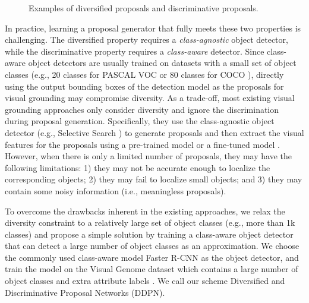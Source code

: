 \documentclass{article}
\begin{document}
\begin{figure}
\begin{center}
\vspace{-10pt}
\caption{Examples of diversified proposals and discriminative proposals.}
\label{fig:ddpg_examples}
\end{center}
\vspace{-20pt}
\end{figure}

In practice, learning a proposal generator that fully meets these two properties is challenging. The diversified property requires a \emph{class-agnostic} object detector, while the discriminative property requires a \emph{class-aware} detector. Since class-aware object detectors are usually trained on datasets with a small set of object classes (e.g., 20 classes for PASCAL VOC \cite{everingham2010pascal} or 80 classes for COCO \cite{lin2014microsoft}), directly using the output bounding boxes of the detection model as the proposals for visual grounding may compromise diversity. As a trade-off, most existing visual grounding approaches only consider diversity and ignore the discrimination during proposal generation. Specifically, they use the {class-agnostic} object detector (e.g., Selective Search \cite{uijlings2013selective}) to generate proposals and then extract the visual features for the proposals using a pre-trained model \cite{rohrbach2016grounding,hu2016natural,lin2014microsoft,fukui2016multimodal} or a fine-tuned model \cite{chen2017query}. However, when there is only a limited number of proposals, they may have the following limitations: 1) they may not be accurate enough to localize the corresponding objects; 2) they may fail to localize small objects; and 3) they may contain some noisy information (i.e., meaningless proposals).

To overcome the drawbacks inherent in the existing approaches, we relax the diversity constraint to a relatively large set of object classes (e.g., more than 1k classes) and propose a simple solution by training a class-aware object detector that can detect a large number of object classes as an approximation. We choose the commonly used class-aware model Faster R-CNN \cite{ren2015faster} as the object detector, and train the model on the Visual Genome dataset which contains a large number of object classes and extra attribute labels \cite{krishna2016visual}. We call our scheme Diversified and Discriminative Proposal Networks (DDPN).
\end{document}
